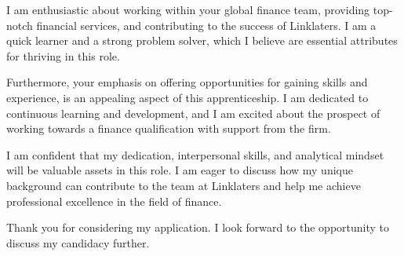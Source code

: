 \documentclass[../main.tex]{subfiles}
\begin{document}
\begin{cvletter}
\begin{cvletter}
I am enthusiastic about working within your global finance team, providing top-notch financial services, and contributing to the success of Linklaters. I am a quick learner and a strong problem solver, which I believe are essential attributes for thriving in this role.

Furthermore, your emphasis on offering opportunities for gaining skills and experience, is an appealing aspect of this apprenticeship. I am dedicated to continuous learning and development, and I am excited about the prospect of working towards a finance qualification with support from the firm.

I am confident that my dedication, interpersonal skills, and analytical mindset will be valuable assets in this role. I am eager to discuss how my unique background can contribute to the team at Linklaters and help me achieve professional excellence in the field of finance.

Thank you for considering my application. I look forward to the opportunity to discuss my candidacy further.

\end{cvletter}

\makeletterclosing

\vspace*{\fill}

\end{cvletter}
\end{document}
